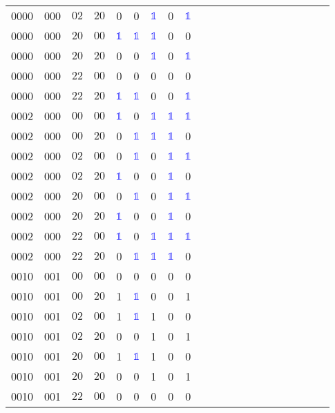 \begin{longtable*}{c| cccccccccccccccccccc }
0000& 000& $02$& $20$& 0& 0& \textcolor{blue}{$\mathds{1}$}& 0& \textcolor{blue}{$\mathds{1}$}\\
0000& 000& $20$& $00$& \textcolor{blue}{$\mathds{1}$}& \textcolor{blue}{$\mathds{1}$}& \textcolor{blue}{$\mathds{1}$}& 0& 0\\
0000& 000& $20$& $20$& 0& 0& \textcolor{blue}{$\mathds{1}$}& 0& \textcolor{blue}{$\mathds{1}$}\\
0000& 000& $22$& $00$& 0& 0& 0& 0& 0\\
0000& 000& $22$& $20$& \textcolor{blue}{$\mathds{1}$}& \textcolor{blue}{$\mathds{1}$}& 0& 0& \textcolor{blue}{$\mathds{1}$}\\
0002& 000& $00$& $00$& \textcolor{blue}{$\mathds{1}$}& 0& \textcolor{blue}{$\mathds{1}$}& \textcolor{blue}{$\mathds{1}$}& \textcolor{blue}{$\mathds{1}$}\\
0002& 000& $00$& $20$& 0& \textcolor{blue}{$\mathds{1}$}& \textcolor{blue}{$\mathds{1}$}& \textcolor{blue}{$\mathds{1}$}& 0\\
0002& 000& $02$& $00$& 0& \textcolor{blue}{$\mathds{1}$}& 0& \textcolor{blue}{$\mathds{1}$}& \textcolor{blue}{$\mathds{1}$}\\
0002& 000& $02$& $20$& \textcolor{blue}{$\mathds{1}$}& 0& 0& \textcolor{blue}{$\mathds{1}$}& 0\\
0002& 000& $20$& $00$& 0& \textcolor{blue}{$\mathds{1}$}& 0& \textcolor{blue}{$\mathds{1}$}& \textcolor{blue}{$\mathds{1}$}\\
0002& 000& $20$& $20$& \textcolor{blue}{$\mathds{1}$}& 0& 0& \textcolor{blue}{$\mathds{1}$}& 0\\
0002& 000& $22$& $00$& \textcolor{blue}{$\mathds{1}$}& 0& \textcolor{blue}{$\mathds{1}$}& \textcolor{blue}{$\mathds{1}$}& \textcolor{blue}{$\mathds{1}$}\\
0002& 000& $22$& $20$& 0& \textcolor{blue}{$\mathds{1}$}& \textcolor{blue}{$\mathds{1}$}& \textcolor{blue}{$\mathds{1}$}& 0\\
0010& 001& $00$& $00$& 0& 0& 0& 0& 0\\
0010& 001& $00$& $20$& 1& \textcolor{blue}{$\mathds{1}$}& 0& 0& 1\\
0010& 001& $02$& $00$& 1& \textcolor{blue}{$\mathds{1}$}& 1& 0& 0\\
0010& 001& $02$& $20$& 0& 0& 1& 0& 1\\
0010& 001& $20$& $00$& 1& \textcolor{blue}{$\mathds{1}$}& 1& 0& 0\\
0010& 001& $20$& $20$& 0& 0& 1& 0& 1\\
0010& 001& $22$& $00$& 0& 0& 0& 0& 0\\

\end{longtable*}
